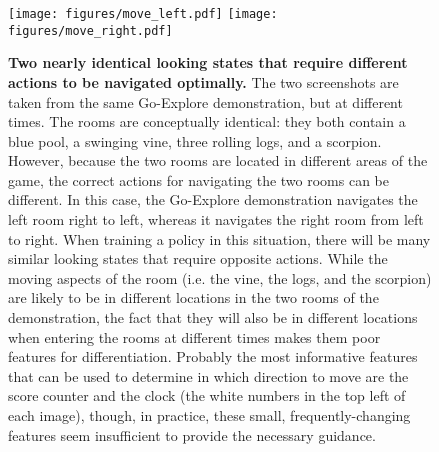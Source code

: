 \documentclass{article}
\begin{document}
\begin{figure}[tbh]
    \centering
    \texttt{[image: figures/move\_left.pdf]}
    \texttt{[image: figures/move\_right.pdf]}
    \caption{\textbf{Two nearly identical looking states that require different actions to be navigated optimally.} The two screenshots are taken from the same Go-Explore demonstration, but at different times. The rooms are conceptually identical: they both contain a blue pool, a swinging vine, three rolling logs, and a scorpion. However, because the two rooms are located in different areas of the game, the correct actions for navigating the two rooms can be different. In this case, the Go-Explore demonstration navigates the left room right to left, whereas it navigates the right room from left to right. When training a policy in this situation, there will be many similar looking states that require opposite actions. While the moving aspects of the room (i.e. the vine, the logs, and the scorpion) are likely to be in different locations in the two rooms of the demonstration, the fact that they will also be in different locations when entering the rooms at different times makes them poor features for differentiation. Probably the most informative features that can be used to determine in which direction to move are the score counter and the clock (the white numbers in the top left of each image), though, in practice, these small, frequently-changing features seem insufficient to provide the necessary guidance.}

    \label{fig:pitfall_nearly_identical_states}
\end{figure}

\FloatBarrier
\end{document}
